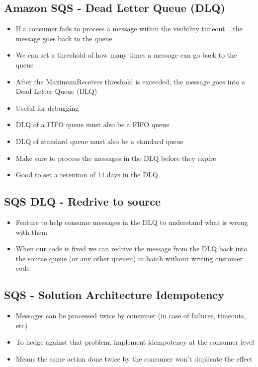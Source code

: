 \subsection{Amazon SQS - Dead Letter Queue (DLQ)}
\begin{itemize}
    \item If a consumer fails to process a message within the visibility timeout....the message goes back to the queue
    \item We can set a threshold of how many times a message can go back to the queue
    \item After the MaximumReceives threshold is exceeded, the message goes into a Dead Letter Queue (DLQ)
    \item Useful for debugging
    \item DLQ of a FIFO queue must also be a FIFO queue
    \item DLQ of standard queue must also be a standard queue
    \item Make sure to process the messages in the DLQ before they expire
    \item Good to set a retention of 14 days in the DLQ
\end{itemize}

\subsection{SQS DLQ - Redrive to source}
\begin{itemize}
    \item Feature to help consume messages in the DLQ to understand what is wrong with them
    \item When our code is fixed we can redrive the message from the DLQ back into the source queue (or any other queueu) in batch without writing customer code
\end{itemize}

\subsection{SQS - Solution Architecture Idempotency}
\begin{itemize}
    \item Messages can be processed twice by consumer (in case of failures, timeouts, etc)
    \item To hedge against that problem, implement idempotency at the consumer level
    \item Means the same action done twice by the consumer won't duplicate the effect
\end{itemize}

